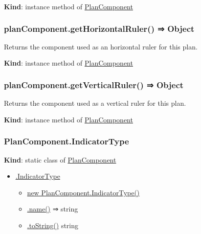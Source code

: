 \documentclass[a4paper]{report}
\providecommand{\tightlist}{%
  \setlength{\itemsep}{0pt}\setlength{\parskip}{0pt}}
\begin{document}
\textbf{Kind}: instance method of
\protect\hyperlink{PlanComponent}{PlanComponent}\\

\hypertarget{plancomponent.gethorizontalruler-object}{%
\subsubsection{planComponent.getHorizontalRuler() ⇒
Object}\label{plancomponent.gethorizontalruler-object}}

Returns the component used as an horizontal ruler for this plan.

\textbf{Kind}: instance method of
\protect\hyperlink{PlanComponent}{PlanComponent}\\

\hypertarget{plancomponent.getverticalruler-object}{%
\subsubsection{planComponent.getVerticalRuler() ⇒
Object}\label{plancomponent.getverticalruler-object}}

Returns the component used as a vertical ruler for this plan.

\textbf{Kind}: instance method of
\protect\hyperlink{PlanComponent}{PlanComponent}\\

\hypertarget{plancomponent.indicatortype}{%
\subsubsection{PlanComponent.IndicatorType}\label{plancomponent.indicatortype}}

\textbf{Kind}: static class of
\protect\hyperlink{PlanComponent}{PlanComponent}

\begin{itemize}
\tightlist
\item
  \protect\hyperlink{PlanComponent.IndicatorType}{.IndicatorType}

  \begin{itemize}
  \tightlist
  \item
    \protect\hyperlink{new_PlanComponent.IndicatorType_new}{new
    PlanComponent.IndicatorType()}
  \item
    \protect\hyperlink{PlanComponent.IndicatorType+name}{.name()} ⇒
    string
  \item
    \protect\hyperlink{PlanComponent.IndicatorType+toString}{.toString()}
    string
  \end{itemize}
\end{itemize}
\end{document}

